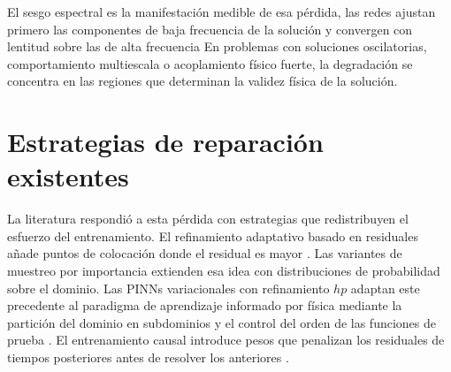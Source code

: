 El sesgo espectral es la manifestación medible de esa pérdida, las redes ajustan primero las componentes de baja frecuencia de la solución y convergen con lentitud sobre las de alta frecuencia  En problemas con soluciones oscilatorias, comportamiento multiescala o acoplamiento físico fuerte, la degradación se concentra  en las regiones que determinan la validez física de la solución.

\section{Estrategias de reparación existentes}

La literatura respondió a esta pérdida con estrategias que redistribuyen el esfuerzo del entrenamiento. El refinamiento adaptativo basado en residuales añade puntos de colocación donde el residual es mayor \cite{lu2021deepxde}. Las variantes de muestreo por importancia extienden esa idea con distribuciones de probabilidad sobre el dominio.  Las PINNs variacionales con refinamiento $hp$ adaptan este precedente al paradigma de aprendizaje informado por física mediante la partición del dominio en subdominios y el control del orden de las funciones de prueba \cite{kharazmi2021hpvpinns}. El entrenamiento causal introduce pesos que penalizan los residuales de tiempos posteriores antes de resolver los anteriores \cite{wang2024causal}.

\begin{table}[htbp]
  \centering
  \small
  \caption{Estrategias existentes sobre los cuatro ejes de evaluación del capítulo.}
  \label{tab:rejilla}
\end{table}

